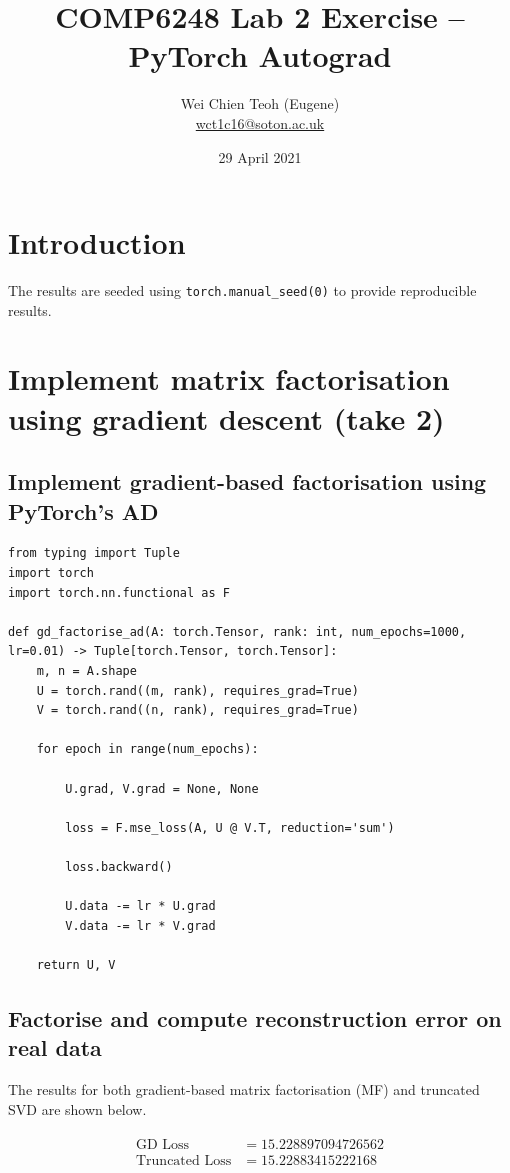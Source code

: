 \documentclass[10pt, twocolumn]{article}
\title{\Large COMP6248 Lab 2 Exercise -- PyTorch Autograd}
\author{\small Wei Chien Teoh (Eugene)\\\bigskip \href{mailto:wct1c16@soton.ac.uk}{wct1c16@soton.ac.uk}}
\date{\small 29 April 2021}
\begin{document}
\maketitle

\section*{Introduction}

The results are seeded using \lstinline{torch.manual_seed(0)} to provide reproducible results.

\section{Implement matrix factorisation using gradient descent (take 2)}

\subsection{Implement gradient-based factorisation using PyTorch's AD}

\begin{lstlisting}
from typing import Tuple
import torch
import torch.nn.functional as F

def gd_factorise_ad(A: torch.Tensor, rank: int, num_epochs=1000, lr=0.01) -> Tuple[torch.Tensor, torch.Tensor]:
    m, n = A.shape
    U = torch.rand((m, rank), requires_grad=True)
    V = torch.rand((n, rank), requires_grad=True)

    for epoch in range(num_epochs):
        
        U.grad, V.grad = None, None

        loss = F.mse_loss(A, U @ V.T, reduction='sum')

        loss.backward()

        U.data -= lr * U.grad
        V.data -= lr * V.grad

    return U, V

\end{lstlisting}

\subsection{Factorise and compute reconstruction error on real data}

The results for both gradient-based matrix factorisation (MF) and truncated SVD are shown below.

\begin{align*}
    \begin{split}
        \text{GD Loss} &= 15.228897094726562\\
        \text{Truncated Loss} &= 15.22883415222168
    \end{split}
\end{align*}
\end{document}
